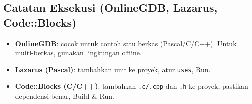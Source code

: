 \documentclass[../main.tex]{subfiles}
\begin{document}
\subsection{Catatan Eksekusi (OnlineGDB, Lazarus, Code::Blocks)}
\begin{itemize}
  \item \textbf{OnlineGDB}: cocok untuk contoh satu berkas (Pascal/C/C++). Untuk multi-berkas, gunakan lingkungan offline.
  \item \textbf{Lazarus (Pascal)}: tambahkan unit ke proyek, atur \texttt{uses}, Run.
  \item \textbf{Code::Blocks (C/C++)}: tambahkan \texttt{.c/.cpp} dan \texttt{.h} ke proyek, pastikan dependensi benar, Build \& Run.
\end{itemize}
\end{document}
